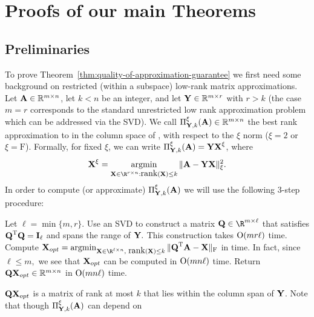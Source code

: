 \section{Proofs of our main Theorems}\label{sec:proofs}

\subsection{Preliminaries}

To prove Theorem~\ref{thm:quality-of-approximation-guarantee} we first need some background on restricted (within a subspace) low-rank
matrix approximations. Let ${\bm{\mathrm{A}}} \in \mathbb{R}^{m \times n}$, let $k < n$ be an integer, and let
${\bm{\mathrm{Y}}} \in \mathbb{R}^{m \times r}$ with $ r > k$
(the case $m = r$ corresponds to the standard unrestricted
low rank approximation problem which can be addressed via the SVD).
We call $\Pi_{{\bm{\mathrm{Y}}},k}^\xi({\bm{\mathrm{A}}}) \in \mathbb{R}^{m \times n}$  the best rank
 approximation to \math{\matA} in the column space of \math{\matY}, with respect to the $\xi$ norm ($\xi=2$ or $\xi = \mathrm{F}$).
Formally, for fixed $\xi$, we can write
$\Pi_{{\bm{\mathrm{Y}}},k}^\xi({\bm{\mathrm{A}}}) = {\bm{\mathrm{Y}}}{\bm{\mathrm{X}}}^\xi$, where
%
$$
\matX^\xi = \argmin_{\matX \in {\R}^{r \times n}:\rank(\matX)\leq k}\XNormS{\matA-
\matY\matX}.
$$
%
In order to compute (or approximate) $\Pi_{{\bm{\mathrm{Y}}},k}^{\xi}({\bm{\mathrm{A}}})$ we will use the following 3-step procedure:
%
\begin{center}
\begin{algorithmic}[1]
%
\STATE Let $\ell = \min\{m,r\}.$ Use an SVD to construct a matrix $\matQ \in \R^{m \times \ell}$ that satisfies ${\bm{\mathrm{Q}}}^{\textsc{T}} {\bm{\mathrm{Q}}} = {\bm{\mathrm{I}}}_\ell$ and spans the range of ${\bm{\mathrm{Y}}}.$
This construction takes $\mathrm{O}(m r \ell)$ time.
%
\STATE Compute $\matX_{opt} = \argmin_{\matX \in \R^{\ell \times n},\,\, \rank(\matX) \le k}\FNorm{ \matQ\transp \matA - \matX }$ in
  time. In fact, since $\ell \leq m,$ we see that ${\bm{\mathrm{X}}}_{opt}$ can be computed in $\mathrm{O}(mn\ell)$ time.
%
\STATE Return %
${\bm{\mathrm{Q}}}{\bm{\mathrm{X}}}_{opt} \in \mathbb{R}^{m \times n}$ in $\mathrm{O}(mn\ell)$ time.
%
\end{algorithmic}
\end{center}
%
${\bm{\mathrm{Q}}}{\bm{\mathrm{X}}}_{opt}$ is a matrix of rank at most $k$ that lies within the column span
of ${\bm{\mathrm{Y}}}$. Note that though  $\Pi_{{\bm{\mathrm{Y}}},k}^{\xi}({\bm{\mathrm{A}}})$ can depend on
